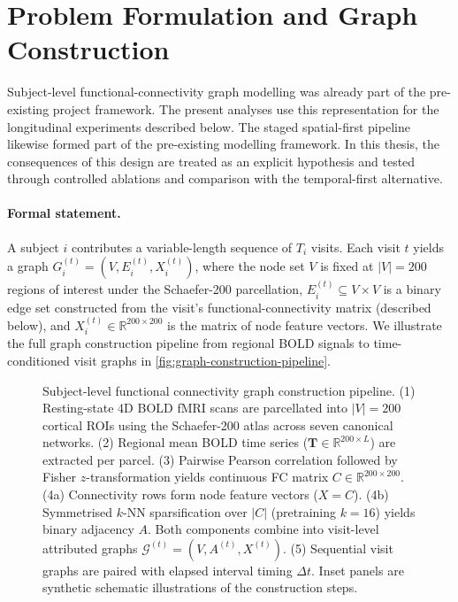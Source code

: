 \section{Problem Formulation and Graph Construction}\label{sec:problem-formulation}

Subject-level functional-connectivity graph modelling was already part of the pre-existing
project framework. The present analyses use this representation for the longitudinal
experiments described below. The staged spatial-first pipeline likewise formed part of the
pre-existing modelling framework. In this thesis, the consequences of this design are
treated as an explicit hypothesis and tested through controlled ablations and comparison
with the temporal-first alternative.

\paragraph{Formal statement.}
A subject $i$ contributes a variable-length sequence of $T_i$ visits. Each visit $t$
yields a graph $G_i^{(t)} = (V, E_i^{(t)}, X_i^{(t)})$, where the node set $V$ is fixed
at $|V| = 200$ regions of interest under the Schaefer-200 parcellation,
$E_i^{(t)} \subseteq V \times V$ is a binary edge set constructed from the visit's
functional-connectivity matrix (described below), and $X_i^{(t)} \in \mathbb{R}^{200
\times 200}$ is the matrix of node feature vectors. We illustrate the full graph construction pipeline from regional \ac{BOLD} signals to time-conditioned visit graphs in \autoref{fig:graph-construction-pipeline}.

\begin{figure}[p]
  \centering
  \resizebox{0.78\textwidth}{!}{}
  \caption{Subject-level functional connectivity graph construction pipeline. (1) Resting-state 4D BOLD fMRI scans are parcellated into $|V| = 200$ cortical ROIs using the Schaefer-200 atlas across seven canonical networks. (2) Regional mean BOLD time series ($\mathbf{T} \in \mathbb{R}^{200 \times L}$) are extracted per parcel. (3) Pairwise Pearson correlation followed by Fisher $z$-transformation yields continuous FC matrix $C \in \mathbb{R}^{200 \times 200}$. (4a) Connectivity rows form node feature vectors ($X = C$). (4b) Symmetrised $k$-NN sparsification over $|C|$ (pretraining $k=16$) yields binary adjacency $A$. Both components combine into visit-level attributed graphs $\mathcal{G}^{(t)} = (V, A^{(t)}, X^{(t)})$. (5) Sequential visit graphs are paired with elapsed interval timing $\Delta t$. Inset panels are synthetic schematic illustrations of the construction steps.}
  \label{fig:graph-construction-pipeline}
\end{figure}

